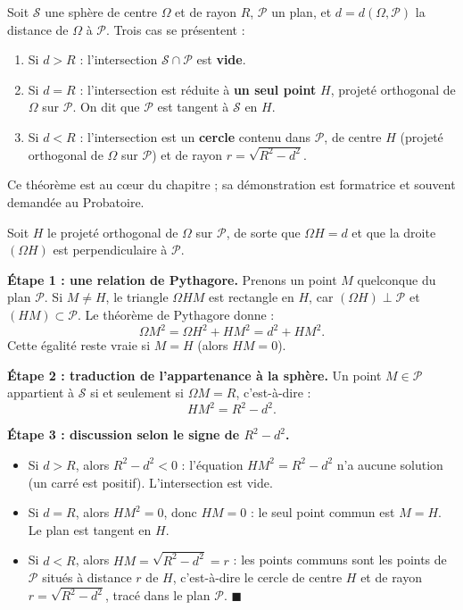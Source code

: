 \documentclass[11pt]{article}
\newcommand{\cle}[1]{{\popxbold\color{popdark}#1}}
\begin{document}
\begin{propriete}
Soit $\mathcal{S}$ une sphère de centre $\Omega$ et de rayon $R$, $\mathcal{P}$ un plan, et $d=d(\Omega,\mathcal{P})$ la distance de $\Omega$ à $\mathcal{P}$. Trois cas se présentent :
\begin{enumerate}
\item Si $d>R$ : l'intersection $\mathcal{S}\cap\mathcal{P}$ est \textbf{vide}.
\item Si $d=R$ : l'intersection est réduite à \textbf{un seul point} $H$, projeté orthogonal de $\Omega$ sur $\mathcal{P}$. On dit que $\mathcal{P}$ est \cle{tangent} à $\mathcal{S}$ en $H$.
\item Si $d<R$ : l'intersection est un \textbf{cercle} contenu dans $\mathcal{P}$, de centre $H$ (projeté orthogonal de $\Omega$ sur $\mathcal{P}$) et de rayon $r=\sqrt{R^{2}-d^{2}}$.
\end{enumerate}
Ce théorème est au c\oe ur du chapitre ; sa démonstration est formatrice et souvent demandée au Probatoire.
\end{propriete}

\begin{experience}
Soit $H$ le projeté orthogonal de $\Omega$ sur $\mathcal{P}$, de sorte que $\Omega H=d$ et que la droite $(\Omega H)$ est perpendiculaire à $\mathcal{P}$.

\textbf{Étape 1 : une relation de Pythagore.} Prenons un point $M$ quelconque du plan $\mathcal{P}$. Si $M\neq H$, le triangle $\Omega HM$ est rectangle en $H$, car $(\Omega H)\perp\mathcal{P}$ et $(HM)\subset\mathcal{P}$. Le théorème de Pythagore donne :
\[
\Omega M^{2}=\Omega H^{2}+HM^{2}=d^{2}+HM^{2}.
\]
Cette égalité reste vraie si $M=H$ (alors $HM=0$).

\textbf{Étape 2 : traduction de l'appartenance à la sphère.} Un point $M\in\mathcal{P}$ appartient à $\mathcal{S}$ si et seulement si $\Omega M=R$, c'est-à-dire :
\[
HM^{2}=R^{2}-d^{2}.
\]

\textbf{Étape 3 : discussion selon le signe de $R^{2}-d^{2}$.}
\begin{itemize}
\item Si $d>R$, alors $R^{2}-d^{2}<0$ : l'équation $HM^{2}=R^{2}-d^{2}$ n'a aucune solution (un carré est positif). L'intersection est vide.
\item Si $d=R$, alors $HM^{2}=0$, donc $HM=0$ : le seul point commun est $M=H$. Le plan est tangent en $H$.
\item Si $d<R$, alors $HM=\sqrt{R^{2}-d^{2}}=r$ : les points communs sont les points de $\mathcal{P}$ situés à distance $r$ de $H$, c'est-à-dire le cercle de centre $H$ et de rayon $r=\sqrt{R^{2}-d^{2}}$, tracé dans le plan $\mathcal{P}$. $\blacksquare$
\end{itemize}
\end{experience}
\end{document}
